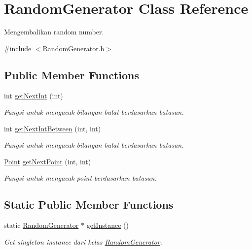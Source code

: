 \hypertarget{class_random_generator}{}\section{Random\+Generator Class Reference}
\label{class_random_generator}


Mengembalikan random number.  




{\ttfamily \#include $<$Random\+Generator.\+h$>$}

\subsection*{Public Member Functions}
\begin{DoxyCompactItemize}
\item 
int \hyperlink{class_random_generator_a7bdfd5b421ffaa1de622804fee51c3eb}{get\+Next\+Int} (int)
\begin{DoxyCompactList}\small\item\em Fungsi untuk mengacak bilangan bulat berdasarkan batasan. \end{DoxyCompactList}\item 
int \hyperlink{class_random_generator_ab230d076577cb8a5719b866ad2d23460}{get\+Next\+Int\+Between} (int, int)
\begin{DoxyCompactList}\small\item\em Fungsi untuk mengacak bilangan bulat berdasarkan batasan. \end{DoxyCompactList}\item 
\hyperlink{class_point}{Point} \hyperlink{class_random_generator_a4c6407b76023eed6f10e58996c0fdcae}{get\+Next\+Point} (int, int)
\begin{DoxyCompactList}\small\item\em Fungsi untuk mengacak point berdasarkan batasan. \end{DoxyCompactList}\end{DoxyCompactItemize}
\subsection*{Static Public Member Functions}
\begin{DoxyCompactItemize}
\item 
static \hyperlink{class_random_generator}{Random\+Generator} $\ast$ \hyperlink{class_random_generator_abc2ce3ecccf8a36af2ab362effd7e5a1}{get\+Instance} ()
\begin{DoxyCompactList}\small\item\em Get singleton instance dari kelas \hyperlink{class_random_generator}{Random\+Generator}. \end{DoxyCompactList}\end{DoxyCompactItemize}


